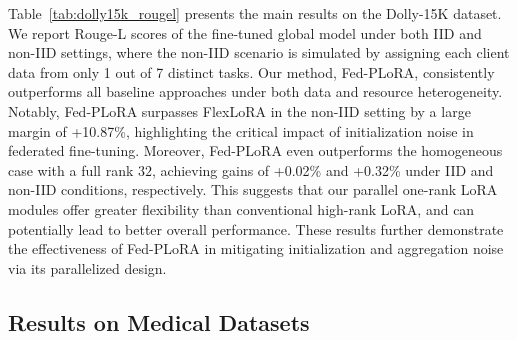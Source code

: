 \documentclass{article} %
\begin{document}
Table~\ref{tab:dolly15k_rougel} presents the main results on the Dolly-15K dataset. We report Rouge-L scores of the fine-tuned global model under both IID and non-IID settings, where the non-IID scenario is simulated by assigning each client data from only 1 out of 7 distinct tasks. Our method, Fed-PLoRA, consistently outperforms all baseline approaches under both data and resource heterogeneity. Notably, Fed-PLoRA surpasses FlexLoRA in the non-IID setting by a large margin of +10.87\%, highlighting the critical impact of initialization noise in federated fine-tuning. Moreover, Fed-PLoRA even outperforms the homogeneous case with a full rank $32$, achieving gains of +0.02\% and +0.32\% under IID and non-IID conditions, respectively. This suggests that our parallel one-rank LoRA modules offer greater flexibility than conventional high-rank LoRA, and can potentially lead to better overall performance. These results further demonstrate the effectiveness of Fed-PLoRA in mitigating initialization and aggregation noise via its parallelized design.

\subsection{Results on Medical Datasets}\label{appendixsubsection:medical}
\end{document}
